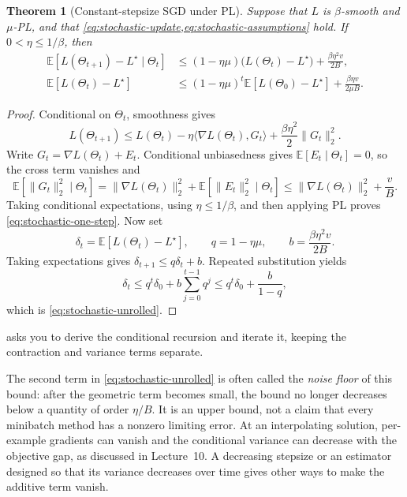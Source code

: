 \documentclass[11pt,twoside]{article}
\newcommand{\E}{\mathbb E}
\newtheorem{theorem}{Theorem}[section]
\theoremstyle{definition}
\theoremstyle{remark}
\begin{document}
\begin{theorem}[Constant-stepsize SGD under PL]
\label{thm:stochastic-pl}
Suppose that $L$ is $\beta$-smooth and $\mu$-PL, and that
\cref{eq:stochastic-update,eq:stochastic-assumptions} hold. If
$0<\eta\le1/\beta$, then
\begin{align}
 \E[L(\Theta_{t+1})-L^\star\mid\Theta_t]
 &\le(1-\eta\mu)\bigl(L(\Theta_t)-L^\star\bigr)
 +\frac{\beta\eta^2v}{2B},
 \label{eq:stochastic-one-step}\\
 \E[L(\Theta_t)-L^\star]
 &\le(1-\eta\mu)^t\E[L(\Theta_0)-L^\star]
 +\frac{\beta\eta v}{2\mu B}.
 \label{eq:stochastic-unrolled}
\end{align}
\end{theorem}

\begin{proof}
Conditional on $\Theta_t$, smoothness gives
\[
 L(\Theta_{t+1})
 \le L(\Theta_t)-\eta\langle\nabla L(\Theta_t),G_t\rangle
 +\frac{\beta\eta^2}{2}\|G_t\|_2^2.
\]
Write $G_t=\nabla L(\Theta_t)+E_t$. Conditional unbiasedness gives
$\E[E_t\mid\Theta_t]=0$, so the cross term vanishes and
\[
 \E[\|G_t\|_2^2\mid\Theta_t]
 =\|\nabla L(\Theta_t)\|_2^2
  +\E[\|E_t\|_2^2\mid\Theta_t]
 \le\|\nabla L(\Theta_t)\|_2^2+\frac vB.
\]
Taking conditional expectations, using $\eta\le1/\beta$, and then applying
PL proves \cref{eq:stochastic-one-step}. Now set
\[
 \delta_t=\E[L(\Theta_t)-L^\star],
 \qquad q=1-\eta\mu,
 \qquad b=\frac{\beta\eta^2v}{2B}.
\]
Taking expectations gives $\delta_{t+1}\le q\delta_t+b$. Repeated
substitution yields
\[
 \delta_t\le q^t\delta_0+b\sum_{j=0}^{t-1}q^j
 \le q^t\delta_0+\frac{b}{1-q},
\]
which is \cref{eq:stochastic-unrolled}.
\end{proof}

 asks you to derive the conditional recursion and
iterate it, keeping the contraction and variance terms separate.

The second term in \cref{eq:stochastic-unrolled} is often called the
\emph{noise floor} of this bound: after the geometric term becomes small, the
bound no longer decreases below a quantity of order $\eta/B$. It is an upper
bound, not a claim that every minibatch method has a nonzero limiting error.
At an interpolating solution,
per-example gradients can vanish and the conditional variance can decrease
with the objective gap, as discussed in Lecture~10. A decreasing stepsize or
an estimator designed so that its variance decreases over time gives other
ways to make the additive term vanish.
\end{document}
